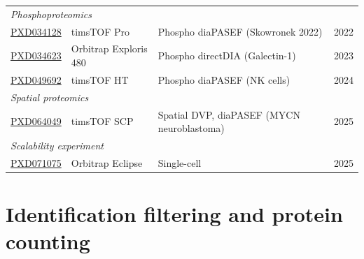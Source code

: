 \documentclass[preprint,12pt]{elsarticle}
\newcommand{\sdrf}[1]{\href{https://github.com/bigbio/sdrf-annotated-datasets/blob/main/datasets/#1/#1.sdrf.tsv}{#1}}
\begin{document}
\begin{table}[htbp]
{\begin{tabular}{ll>{\raggedright\arraybackslash}p{}l}
\hline
\multicolumn{4}{l}{\textit{Phosphoproteomics}} \\
\sdrf{PXD034128} & timsTOF Pro & Phospho diaPASEF (Skowronek 2022) & 2022 \\
\sdrf{PXD034623} & Orbitrap Exploris 480 & Phospho directDIA (Galectin-1) & 2023 \\
\sdrf{PXD049692} & timsTOF HT & Phospho diaPASEF (NK cells) & 2024 \\
\hline
\multicolumn{4}{l}{\textit{Spatial proteomics}} \\
\sdrf{PXD064049} & timsTOF SCP & Spatial DVP, diaPASEF (MYCN neuroblastoma) & 2025 \\
\hline
\multicolumn{4}{l}{\textit{Scalability experiment}} \\
\sdrf{PXD071075} & Orbitrap Eclipse & Single-cell & 2025 \\
\hline
\end{tabular}}
\end{table}

\section{Identification filtering and protein counting}
\label{sec:supp-filter}
\end{document}
